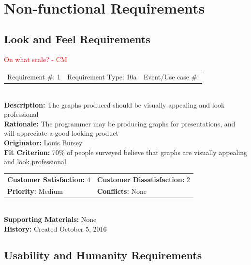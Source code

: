 \documentclass[12pt, titlepage]{article}
\begin{document}
\section{Non-functional Requirements} %

\subsection{Look and Feel Requirements}
%
%
\textcolor{red}{On what scale? - CM} \\
\begin{reqbox}
\begin{tabular}{ccc}
Requirement \#: 1& Requirement Type: 10a & Event/Use case \#: \\
\end{tabular} \\
\textbf{Description:} The graphs produced should be visually appealing and look professional \\
\textbf{Rationale:} The programmer may be producing graphs for presentations, and will appreciate a good looking product \\
\textbf{Originator:} Louis Bursey\\
\textbf{Fit Criterion:} 70\% of people surveyed believe that graphs are visually appealing and look professional  \\
\begin{tabular}{ll}
\textbf{Customer Satisfaction:} 4 & \textbf{Customer Dissatisfaction:} 2 \\
\textbf{Priority:} Medium & \textbf{Conflicts:} None\\
\end{tabular} \\
\textbf{Supporting Materials:} None \\
\textbf{History:} Created October 5, 2016
\end{reqbox}
%
%
\subsection{Usability and Humanity Requirements}
\end{document}
